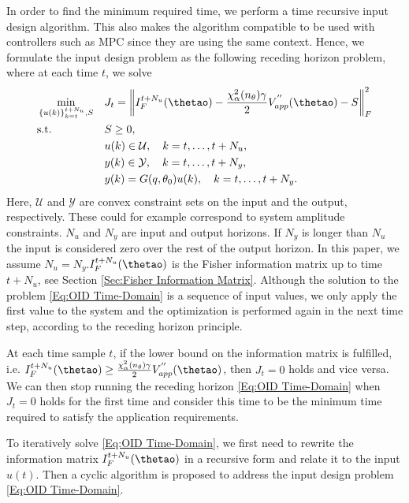 \documentclass{ifacconf}
\begin{document}
In order to find the minimum required time, we perform a time recursive input design algorithm. This also makes the algorithm compatible to be used with controllers such as MPC since they are using the same context. Hence, we formulate the input design problem as the following receding horizon problem, where at each time $t$, we solve
\vspace{-0.4cm}
\begin{eqnarray} \label{Eq:OID Time-Domain}
\begin{split}
&\min_{\substack {\{ u(k)\}_{k=t}^{t+N_u},S}}
								&& J_t = {\left \| I_F^{t+N_u}(\thetao) - \frac{\chi^2_\alpha(n_\theta)\gamma}{2}V^{''}_{app}(\thetao) - S  \right \|}_F^2\\
&\text{s.t.}
			  			&& S \geq 0 ,\\
			      		&&& u(k) \in \mathcal{U}, \quad k = t, \ldots, t+N_u,\\
						&&& y(k) \in \mathcal{Y}, \quad k = t, \ldots, t+N_y,\\
						&&& y(k) = G(q,\theta_0)u(k)  , \quad k = t, \ldots, t+N_y.
\end{split}
\end{eqnarray}
Here, $\mathcal{U}$ and $\mathcal{Y}$ are convex constraint sets on the input and the output, respectively. These could for example correspond to system amplitude constraints. $N_u$ and $N_y$ are input and output horizons. If $N_y$ is longer than $N_u$ the input is considered zero over the rest of the output horizon. In this paper, we assume $N_u = N_y$.$I_F^{t+N_u}(\thetao) $ is the Fisher information matrix up to time $t+N_u$, see Section \ref{Sec:Fisher Information Matrix}. Although the solution to the problem \eqref{Eq:OID Time-Domain} is a sequence of input values, we only apply the first value to the system and the optimization is performed again in the next time step, according to the receding horizon principle.

At each time sample $t$, if the lower bound on the information matrix is fulfilled, i.e. $I_F^{t+N_u}(\thetao) \geq \frac{\chi^2_\alpha(n_\theta)\gamma}{2}V^{''}_{app}(\thetao)$, then $J_t = 0$ holds and vice versa.  We can then stop running the receding horizon \eqref{Eq:OID Time-Domain} when $J_t = 0$ holds for the first time and consider this time to be the minimum time required to satisfy the application requirements.

To iteratively solve \eqref{Eq:OID Time-Domain}, we first need to rewrite the information matrix $ I_F^{t+N_u}(\thetao)$ in a recursive form and relate it to the input $u(t)$. Then a cyclic algorithm is proposed to address the input design problem \eqref{Eq:OID Time-Domain}.
 \vspace{-0.05cm}
\end{document}
